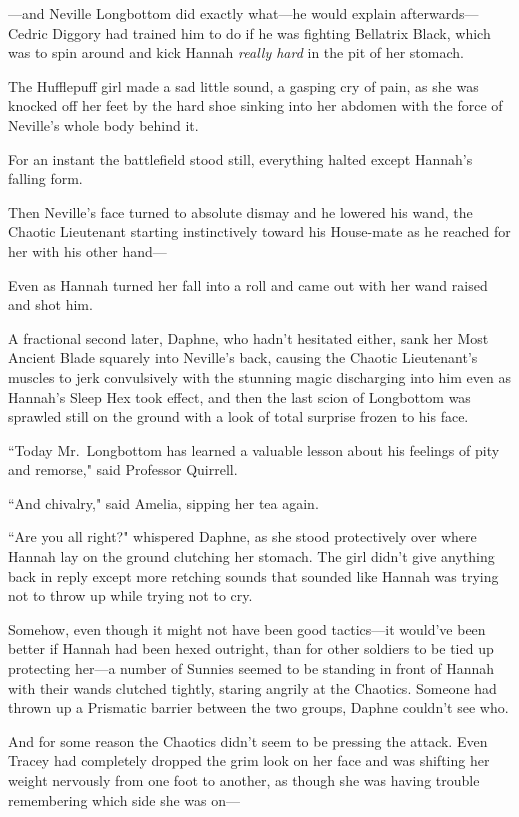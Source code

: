 —and Neville Longbottom did exactly what—he would explain afterwards—Cedric Diggory had trained him to do if he was fighting Bellatrix Black, which was to spin around and kick Hannah \emph{really hard} in the pit of her stomach.

The Hufflepuff girl made a sad little sound, a gasping cry of pain, as she was knocked off her feet by the hard shoe sinking into her abdomen with the force of Neville's whole body behind it.

For an instant the battlefield stood still, everything halted except Hannah's falling form.

Then Neville's face turned to absolute dismay and he lowered his wand, the Chaotic Lieutenant starting instinctively toward his House-mate as he reached for her with his other hand—

Even as Hannah turned her fall into a roll and came out with her wand raised and shot him.

A fractional second later, Daphne, who hadn't hesitated either, sank her Most Ancient Blade squarely into Neville's back, causing the Chaotic Lieutenant's muscles to jerk convulsively with the stunning magic discharging into him even as Hannah's Sleep Hex took effect, and then the last scion of Longbottom was sprawled still on the ground with a look of total surprise frozen to his face.

\later

``Today Mr.~Longbottom has learned a valuable lesson about his feelings of pity and remorse," said Professor Quirrell.

``And chivalry," said Amelia, sipping her tea again.

\later

``Are you all right?" whispered Daphne, as she stood protectively over where Hannah lay on the ground clutching her stomach. The girl didn't give anything back in reply except more retching sounds that sounded like Hannah was trying not to throw up while trying not to cry.

Somehow, even though it might not have been good tactics—it would've been better if Hannah had been hexed outright, than for other soldiers to be tied up protecting her—a number of Sunnies seemed to be standing in front of Hannah with their wands clutched tightly, staring angrily at the Chaotics. Someone had thrown up a Prismatic barrier between the two groups, Daphne couldn't see who.

And for some reason the Chaotics didn't seem to be pressing the attack. Even Tracey had completely dropped the grim look on her face and was shifting her weight nervously from one foot to another, as though she was having trouble remembering which side she was on—


